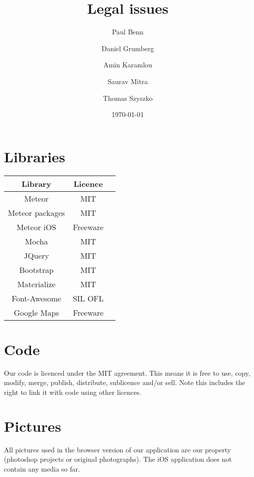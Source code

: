 \documentclass[a4wide, 11pt]{article}
\begin{document}
\title{Legal issues}

\author{Paul Benn \and Daniel Grumberg \and Amin Karamlou \and Saurav Mitra \and Thomas Szyszko }

\date{\today}

\maketitle

\clearpage

\section{Libraries}

\begin{center}
	\begin{tabular}{ |c|c|c| } 
		\hline
		\textbf{Library} & \textbf{Licence} \\
		\hline 
		Meteor & MIT \\ 
		\hline
		Meteor packages & MIT \\ 
		\hline
		Meteor iOS & Freeware \\ 
		\hline
		Mocha & MIT \\ 
		\hline
		JQuery & MIT \\ 
		\hline
		Bootstrap & MIT \\ 
		\hline
		Materialize & MIT \\ 
		\hline
		Font-Awesome & SIL OFL \\ 
		\hline
		Google Maps & Freeware \\ 
		\hline
	\end{tabular}
\end{center}

\section{Code}

Our code is licenced under the MIT agreement. This means it is free to use, copy, modify, merge, publish, distribute, sublicence and/or sell. Note this includes the right to link it with code using other licences.

\section{Pictures}

All pictures used in the browser version of our application are our property (photoshop projects or original photographs). The iOS application does not contain any media so far.
\end{document}
